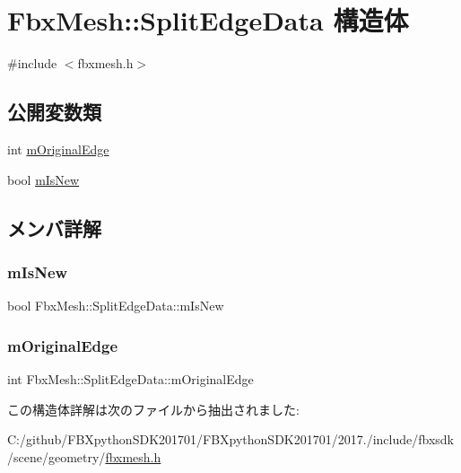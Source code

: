 \hypertarget{struct_fbx_mesh_1_1_split_edge_data}{}\section{Fbx\+Mesh\+:\+:Split\+Edge\+Data 構造体}
\label{struct_fbx_mesh_1_1_split_edge_data}


{\ttfamily \#include $<$fbxmesh.\+h$>$}

\subsection*{公開変数類}
\begin{DoxyCompactItemize}
\item 
int \hyperlink{struct_fbx_mesh_1_1_split_edge_data_a044ee1598a1592278260a1487a0ee698}{m\+Original\+Edge}
\item 
bool \hyperlink{struct_fbx_mesh_1_1_split_edge_data_a98ff97a953aa2eb1010771b2f5e79477}{m\+Is\+New}
\end{DoxyCompactItemize}


\subsection{メンバ詳解}
\mbox{\label{struct_fbx_mesh_1_1_split_edge_data_a98ff97a953aa2eb1010771b2f5e79477}} 
\subsubsection{\texorpdfstring{m\+Is\+New}{mIsNew}}
{\footnotesize\ttfamily bool Fbx\+Mesh\+::\+Split\+Edge\+Data\+::m\+Is\+New}

\mbox{\label{struct_fbx_mesh_1_1_split_edge_data_a044ee1598a1592278260a1487a0ee698}} 
\subsubsection{\texorpdfstring{m\+Original\+Edge}{mOriginalEdge}}
{\footnotesize\ttfamily int Fbx\+Mesh\+::\+Split\+Edge\+Data\+::m\+Original\+Edge}



この構造体詳解は次のファイルから抽出されました\+:\begin{DoxyCompactItemize}
\item 
C\+:/github/\+F\+B\+Xpython\+S\+D\+K201701/\+F\+B\+Xpython\+S\+D\+K201701/2017./include/fbxsdk/scene/geometry/\hyperlink{fbxmesh_8h}{fbxmesh.\+h}\end{DoxyCompactItemize}
